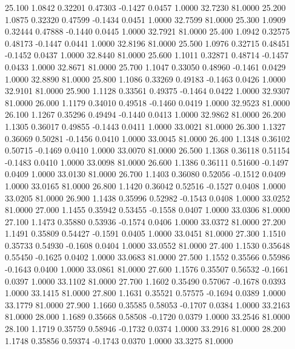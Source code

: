   25.100   1.0842   0.32201   0.47303  -0.1427   0.0457   1.0000  32.7230  81.0000
  25.200   1.0875   0.32320   0.47599  -0.1434   0.0451   1.0000  32.7599  81.0000
  25.300   1.0909   0.32444   0.47888  -0.1440   0.0445   1.0000  32.7921  81.0000
  25.400   1.0942   0.32575   0.48173  -0.1447   0.0441   1.0000  32.8196  81.0000
  25.500   1.0976   0.32715   0.48451  -0.1452   0.0437   1.0000  32.8440  81.0000
  25.600   1.1011   0.32871   0.48714  -0.1457   0.0433   1.0000  32.8671  81.0000
  25.700   1.1047   0.33050   0.48960  -0.1461   0.0429   1.0000  32.8890  81.0000
  25.800   1.1086   0.33269   0.49183  -0.1463   0.0426   1.0000  32.9101  81.0000
  25.900   1.1128   0.33561   0.49375  -0.1464   0.0422   1.0000  32.9307  81.0000
  26.000   1.1179   0.34010   0.49518  -0.1460   0.0419   1.0000  32.9523  81.0000
  26.100   1.1267   0.35296   0.49494  -0.1440   0.0413   1.0000  32.9862  81.0000
  26.200   1.1305   0.36017   0.49855  -0.1443   0.0411   1.0000  33.0021  81.0000
  26.300   1.1327   0.36069   0.50281  -0.1456   0.0410   1.0000  33.0045  81.0000
  26.400   1.1348   0.36102   0.50715  -0.1469   0.0410   1.0000  33.0070  81.0000
  26.500   1.1368   0.36118   0.51154  -0.1483   0.0410   1.0000  33.0098  81.0000
  26.600   1.1386   0.36111   0.51600  -0.1497   0.0409   1.0000  33.0130  81.0000
  26.700   1.1403   0.36080   0.52056  -0.1512   0.0409   1.0000  33.0165  81.0000
  26.800   1.1420   0.36042   0.52516  -0.1527   0.0408   1.0000  33.0205  81.0000
  26.900   1.1438   0.35996   0.52982  -0.1543   0.0408   1.0000  33.0252  81.0000
  27.000   1.1455   0.35942   0.53455  -0.1558   0.0407   1.0000  33.0306  81.0000
  27.100   1.1473   0.35880   0.53936  -0.1574   0.0406   1.0000  33.0372  81.0000
  27.200   1.1491   0.35809   0.54427  -0.1591   0.0405   1.0000  33.0451  81.0000
  27.300   1.1510   0.35733   0.54930  -0.1608   0.0404   1.0000  33.0552  81.0000
  27.400   1.1530   0.35648   0.55450  -0.1625   0.0402   1.0000  33.0683  81.0000
  27.500   1.1552   0.35566   0.55986  -0.1643   0.0400   1.0000  33.0861  81.0000
  27.600   1.1576   0.35507   0.56532  -0.1661   0.0397   1.0000  33.1102  81.0000
  27.700   1.1602   0.35490   0.57067  -0.1678   0.0393   1.0000  33.1415  81.0000
  27.800   1.1631   0.35521   0.57575  -0.1694   0.0389   1.0000  33.1779  81.0000
  27.900   1.1660   0.35585   0.58053  -0.1707   0.0384   1.0000  33.2163  81.0000
  28.000   1.1689   0.35668   0.58508  -0.1720   0.0379   1.0000  33.2546  81.0000
  28.100   1.1719   0.35759   0.58946  -0.1732   0.0374   1.0000  33.2916  81.0000
  28.200   1.1748   0.35856   0.59374  -0.1743   0.0370   1.0000  33.3275  81.0000

